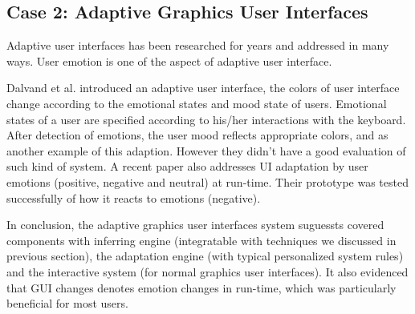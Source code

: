 \subsection{Case 2: Adaptive Graphics User Interfaces}
Adaptive user interfaces has been researched for years \cite{schneider1993adaptive, langley1997machine} and addressed in many ways. User emotion is one of the aspect of adaptive user interface.

Dalvand et al.\cite{Dalvand} introduced an adaptive user interface, the colors of user interface change according to the emotional states and mood state of users. Emotional states of a user are specified according to his/her interactions with the keyboard. After detection of emotions, the user mood reflects appropriate colors, and \cite{Kaiser2006} as another example of this adaption. However they didn't have a good evaluation of such kind of system.
A recent paper \cite{Galindo} also addresses UI adaptation by user emotions (positive, negative and neutral) at run-time. Their prototype was tested successfully of how it reacts to emotions (negative).

In conclusion, the adaptive graphics user interfaces system suguessts covered components with inferring engine (integratable with techniques we discussed in previous section), the adaptation engine (with typical personalized system rules) and the interactive system (for normal graphics user interfaces). It also evidenced that GUI changes denotes emotion changes in run-time, which was particularly beneficial for most users.


